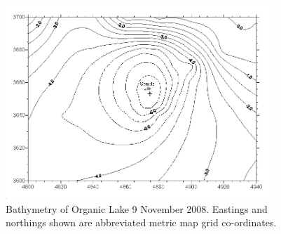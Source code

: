 \begin{figure}
\centering
\includegraphics[width=100mm]{orglake_figures/bathymetry.jpg}
\caption[Bathymetry of Organic Lake]{Bathymetry of Organic Lake 9 November 2008. Eastings and northings shown are abbreviated metric map grid co-ordinates.}
\label{fig:bathymetry}

\end{figure}

